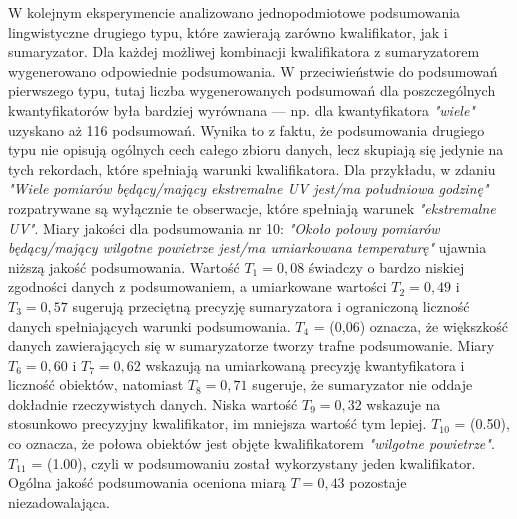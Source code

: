 \documentclass{article}
\begin{document}
W kolejnym eksperymencie analizowano jednopodmiotowe podsumowania lingwistyczne drugiego typu, które zawierają zarówno kwalifikator, jak i sumaryzator. Dla każdej możliwej kombinacji kwalifikatora z sumaryzatorem wygenerowano odpowiednie podsumowania. W przeciwieństwie do podsumowań pierwszego typu, tutaj liczba wygenerowanych podsumowań dla poszczególnych kwantyfikatorów była bardziej wyrównana — np. dla kwantyfikatora \textit{"wiele"} uzyskano aż 116 podsumowań. Wynika to z faktu, że podsumowania drugiego typu nie opisują ogólnych cech całego zbioru danych, lecz skupiają się jedynie na tych rekordach, które spełniają warunki kwalifikatora. Dla przykładu, w zdaniu \textit{"Wiele pomiarów będący/mający ekstremalne UV jest/ma południowa godzinę"} rozpatrywane są wyłącznie te obserwacje, które spełniają warunek \textit{"ekstremalne UV"}.
Miary jakości dla podsumowania nr 10: \textit{"Około połowy pomiarów będący/mający wilgotne powietrze jest/ma umiarkowana temperaturę"} ujawnia niższą jakość podsumowania. Wartość \(T_1 = 0{,}08\) świadczy o bardzo niskiej zgodności danych z podsumowaniem, a umiarkowane wartości \(T_2 = 0{,}49\) i \(T_3 = 0{,}57\) sugerują przeciętną precyzję sumaryzatora i ograniczoną liczność danych spełniających warunki podsumowania. \(T_4\) = (0{,}06) oznacza, że większkość danych zawierających się w sumaryzatorze tworzy trafne podsumowanie. Miary \(T_6 = 0{,}60\) i \(T_7 = 0{,}62\) wskazują na umiarkowaną precyzję kwantyfikatora i liczność obiektów, natomiast \(T_8 = 0{,}71\) sugeruje, że sumaryzator nie oddaje dokładnie rzeczywistych danych. Niska wartość \(T_9 = 0{,}32\) wskazuje na stosunkowo precyzyjny kwalifikator, im mniejsza wartość tym lepiej. \(T_{10}\) = (0.50), co oznacza, że połowa obiektów jest objęte kwalifikatorem \textit{"wilgotne powietrze"}. \(T_{11}\) = (1.00), czyli w podsumowaniu został wykorzystany jeden kwalifikator. Ogólna jakość podsumowania oceniona miarą \(T = 0{,}43\) pozostaje niezadowalająca.

\end{document}
